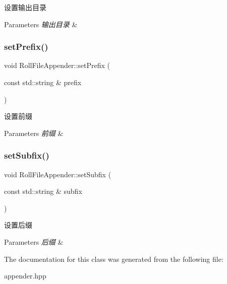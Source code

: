 设置输出目录 


\begin{DoxyParams}{Parameters}
{\em 输出目录} & \\
\hline
\end{DoxyParams}
\mbox{\label{classRollFileAppender_aadef86381b7860ad0d20a6236db02563}} 
\subsubsection{\texorpdfstring{set\+Prefix()}{setPrefix()}}
{\footnotesize\ttfamily void Roll\+File\+Appender\+::set\+Prefix (\begin{DoxyParamCaption}\item[{const std\+::string \&}]{prefix }\end{DoxyParamCaption})\hspace{0.3cm}{\ttfamily [inline]}}



设置前缀 


\begin{DoxyParams}{Parameters}
{\em 前缀} & \\
\hline
\end{DoxyParams}
\mbox{\label{classRollFileAppender_aec2fda1393d840c50828c99db6a736da}} 
\subsubsection{\texorpdfstring{set\+Subfix()}{setSubfix()}}
{\footnotesize\ttfamily void Roll\+File\+Appender\+::set\+Subfix (\begin{DoxyParamCaption}\item[{const std\+::string \&}]{subfix }\end{DoxyParamCaption})\hspace{0.3cm}{\ttfamily [inline]}}



设置后缀 


\begin{DoxyParams}{Parameters}
{\em 后缀} & \\
\hline
\end{DoxyParams}


The documentation for this class was generated from the following file\+:\begin{DoxyCompactItemize}
\item 
appender.\+hpp\end{DoxyCompactItemize}
